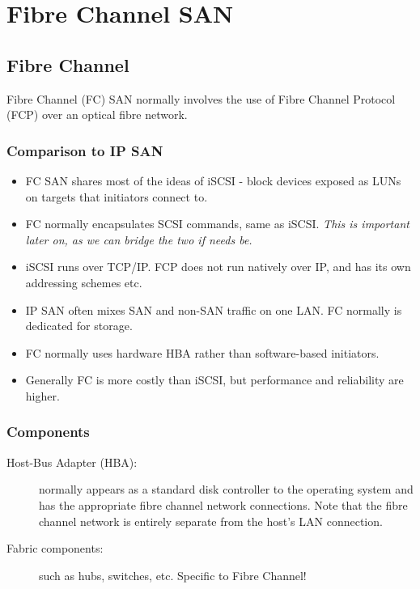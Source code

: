 \chapter{Fibre Channel SAN}
\label{ch:fc-san}

\section{Fibre Channel}
\label{sec:fibre-channel}

Fibre Channel (FC) SAN normally involves the use of Fibre Channel
Protocol (FCP) over an optical fibre network.

\subsection{Comparison to IP SAN}\label{comparison-to-ip-san}

\begin{itemize}
\item
  FC SAN shares most of the ideas of iSCSI - block devices exposed as
  LUNs on targets that initiators connect to.
\item
  FC normally encapsulates SCSI commands, same as iSCSI. \emph{This is
  important later on, as we can bridge the two if needs be.}
\item
  iSCSI runs over TCP/IP. FCP does not run natively over IP, and has its
  own addressing schemes etc.
\item
  IP SAN often mixes SAN and non-SAN traffic on one LAN. FC normally is
  dedicated for storage.
\item
  FC normally uses hardware HBA rather than software-based initiators.
\item
  Generally FC is more costly than iSCSI, but performance and
  reliability are higher.
\end{itemize}

\subsection{Components}\label{components}

\begin{description}
\item[Host-Bus Adapter (HBA):]
normally appears as a standard disk controller to the operating system
and has the appropriate fibre channel network connections. Note that the
fibre channel network is entirely separate from the host's LAN
connection.
\item[Fabric components:]
such as hubs, switches, etc. Specific to Fibre Channel!
\end{description}

